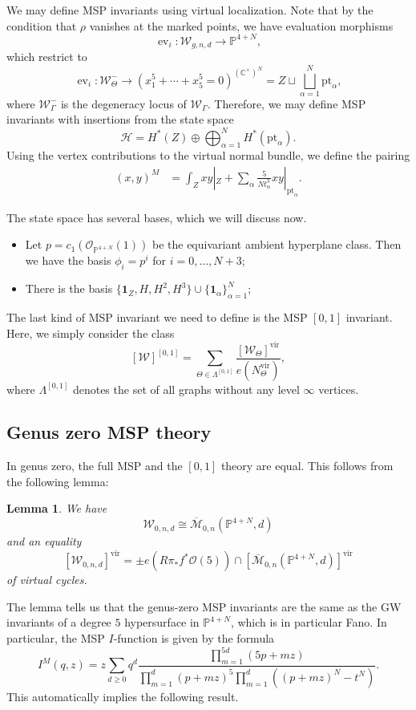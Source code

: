 \documentclass[10pt]{amsart}
\newtheorem{lem}[thm]{Lemma}
\theoremstyle{definition}
\theoremstyle{remark}
\theoremstyle{plain}
\theoremstyle{definition}
\theoremstyle{remark}
\newcommand{\C}{\mathbb{C}}
\renewcommand{\P}{\mathbb{P}}
\newcommand{\Mbar}{\overline{\mathcal{M}}}
\newcommand{\mc}[1]{\mathcal{#1}}
\newcommand{\mr}[1]{\mathrm{#1}}
\newcommand{\1}{\mathbf{1}}
\newcommand{\2}{\mathbf{2}}
\newcommand{\3}{\mathbf{3}}
\newcommand{\vir}{\mr{vir}}
\newcommand{\pt}{\mr{pt}}
\DeclareMathOperator{\ev}{ev}
\begin{document}
We may define MSP invariants using virtual localization. Note that by the condition that $\rho$ vanishes at the marked points, we have evaluation morphisms
\[ \ev_i \colon \mc{W}_{g,n,d} \to \P^{4+N}, \]
which restrict to
\[ \ev_i \colon \mc{W}_{\Theta}^- \to (x_1^5 + \cdots + x_5^5 = 0)^{(\C^{\times})^N} = Z \sqcup \bigsqcup_{\alpha=1}^N \pt_{\alpha}, \]
where $\mc{W}^-_{\Gamma}$ is the degeneracy locus of $\mc{W}_{\Gamma}$. Therefore, we may define MSP invariants with insertions from the state space
\[ \mc{H} = H^*(Z) \oplus \bigoplus_{\alpha=1}^N H^*(\pt_{\alpha}). \]
Using the vertex contributions to the virtual normal bundle, we define the pairing
\begin{align*}
    (x,y)^M &= \int_{Z} xy|_Z + \sum_{\alpha} \frac{5}{N t_{\alpha}^3} xy |_{\pt_{\alpha}}.
\end{align*}

The state space has several bases, which we will discuss now.
\begin{itemize}
    \item Let $p = c_1(\mc{O}_{\P^{4+N}}(1))$ be the equivariant ambient hyperplane class. Then we have the basis $\phi_i = p^i$ for $i=0,\ldots, N+3$;
    \item There is the basis $\{ \1_Z,H,H^2,H^3 \}\cup \{ \1_{\alpha} \}_{\alpha=1}^N$;
\end{itemize}

The last kind of MSP invariant we need to define is the MSP $[0,1]$ invariant. Here, we simply consider the class
\[ [\mc{W}]^{[0,1]} = \sum_{\Theta \in \Lambda^{[0,1]}} \frac{[\mc{W}_{\Theta}]^{\vir}}{e(N_{\Theta}^{\vir})}, \]
where $\Lambda^{[0,1]}$ denotes the set of all graphs without any level $\infty$ vertices.

\subsection{Genus zero MSP theory}%
\label{sub:Genus zero MSP theory}

In genus zero, the full MSP and the $[0,1]$ theory are equal. This follows from the following lemma:
\begin{lem}
    We have
    \[ \mc{W}_{0,n,d} \cong \Mbar_{0,n}(\P^{4+N}, d) \]
    and an equality
    \[ [\mc{W}_{0,n,d}]^{\vir} = \pm e(R\pi_* f^* \mc{O}(5)) \cap [\Mbar_{0,n}(\P^{4+N},d)]^{\vir} \]
    of virtual cycles.
\end{lem}
The lemma tells us that the genus-zero MSP invariants are the same as the GW invariants of a degree $5$ hypersurface in $\P^{4+N}$, which is in particular Fano. In particular,
the MSP $I$-function is given by the formula
\[ I^M(q,z) = z \sum_{d \geq 0} q^d \frac{\prod_{m=1}^{5d} (5p+mz)}{\prod_{m=1}^d (p+mz)^5 \prod_{m=1}^d ((p+mz)^N - t^N)}. \]
This automatically implies the following result.
\end{document}
